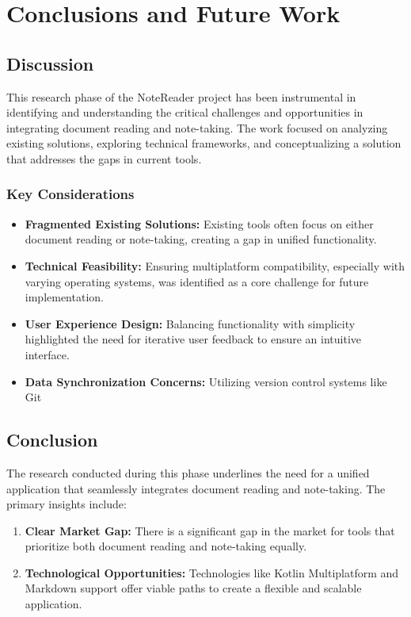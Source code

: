 \chapter{Conclusions and Future Work}
\label{chap:conclusions}

\section{Discussion}
This research phase of the NoteReader project has been instrumental in identifying and understanding the critical challenges and opportunities in integrating document reading and note-taking. The work focused on analyzing existing solutions, exploring technical frameworks, and conceptualizing a solution that addresses the gaps in current tools.

\subsection{Key Considerations}
\begin{itemize}
    \item \textbf{Fragmented Existing Solutions:} Existing tools often focus on either document reading or note-taking, creating a gap in unified functionality.
    \item \textbf{Technical Feasibility:} Ensuring multiplatform compatibility, especially with varying operating systems, was identified as a core challenge for future implementation.
    \item \textbf{User Experience Design:} Balancing functionality with simplicity highlighted the need for iterative user feedback to ensure an intuitive interface.
    \item \textbf{Data Synchronization Concerns:} Utilizing version control systems like Git
\end{itemize}



\section{Conclusion}
The research conducted during this phase underlines the need for a unified application that seamlessly integrates document reading and note-taking. The primary insights include:

\begin{enumerate}
    \item \textbf{Clear Market Gap:} There is a significant gap in the market for tools that prioritize both document reading and note-taking equally.
    \item \textbf{Technological Opportunities:} Technologies like Kotlin Multiplatform and Markdown support offer viable paths to create a flexible and scalable application.
\end{enumerate}

